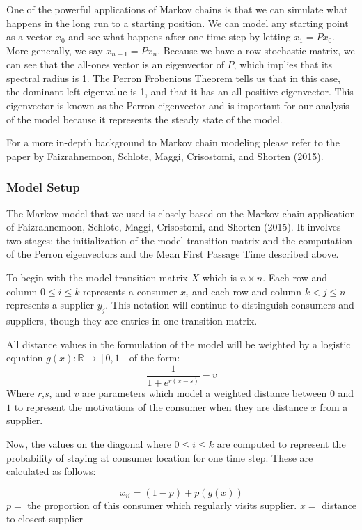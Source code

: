 \documentclass[twoside,twocolumn]{article}
\begin{document}
One of the powerful applications of Markov chains is that we can simulate what happens in the long run to a starting position.
We can model any starting point as a vector $x_0$ and see what happens after one time step by letting $x_1 = P x_0$.
More generally, we say $x_{n + 1} = P x_n$.
Because we have a row stochastic matrix, we can see that the all-ones vector is an eigenvector of $P$, which implies that its spectral radius is 1.
The Perron Frobenious Theorem tells us that in this case, the dominant left eigenvalue is 1, and that it has an all-positive eigenvector.
This eigenvector is known as the Perron eigenvector and is important for our analysis of the model because it represents the steady state of the model.

For a more in-depth background to Markov chain modeling please refer to the paper by Faizrahnemoon, Schlote, Maggi, Crisostomi, and Shorten (2015).

\subsubsection{Model Setup}

The Markov model that we used is closely based on the Markov chain application of Faizrahnemoon, Schlote, Maggi, Crisostomi, and Shorten (2015).
It involves two stages: the initialization of the model transition matrix and the computation of the Perron eigenvectors and the Mean First Passage Time described above.

To begin with the model transition matrix $X$ which is $n \times n$.
Each row and column $0 \leq i \leq k$ represents a consumer $x_i$ and each row and column $k < j \leq n$ represents a supplier $y_j$.
This notation will continue to distinguish consumers and suppliers, though they are entries in one transition matrix.

All distance values in the formulation of the model will be weighted by a logistic equation $g(x): \mathbb{R} \rightarrow [0,1]$ of the form:
$$\frac{1}{1 + e^{r(x-s)}} - v$$
Where $r$,$s$, and $v$ are parameters which model  a weighted distance between $0$ and $1$ to represent the motivations of the consumer when they are distance $x$ from a supplier.

Now, the values on the diagonal where $0 \leq i \leq k$ are computed to represent the probability of staying at consumer location for one time step.
These are calculated as follows:

$$x_{ii} = (1-p) + p(g(x))$$
$p =$ the proportion of this consumer which regularly visits supplier.
$x =$ distance to closest supplier
\end{document}
